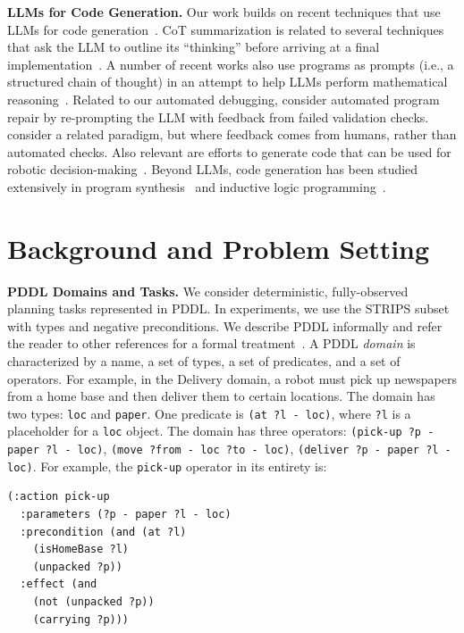 \documentclass[letterpaper]{article} %
\begin{document}
\textbf{LLMs for Code Generation.}
Our work builds on recent techniques that use LLMs for code generation~\cite{chen2021evaluating,nijkamp2023codegen}.
CoT summarization is related to several techniques that ask the LLM to outline its ``thinking'' before arriving at a final implementation~\cite{wei2022chain,jiang2023self,zheng2023outline}.
A number of recent works also use programs as prompts (i.e.,  a structured chain of thought) in an attempt to help LLMs perform mathematical reasoning~\cite{gao2022pal,imani2023mathprompter}.
Related to our automated debugging, \citet{xia2023conversational,chen2023teaching} consider automated program repair by re-prompting the LLM with feedback from failed validation checks.
\citet{chen2023improving} consider a related paradigm, but where feedback comes from humans, rather than automated checks.
Also relevant are efforts to generate code that can be used for robotic decision-making~\cite{liang2022code,singh2022progprompt}.
Beyond LLMs, code generation has been studied extensively in program synthesis~\cite{alur2013syntax,gulwani2017program} and inductive logic programming~\cite{muggleton1991inductive,cropper2022inductive}.

\section{Background and Problem Setting}

\textbf{PDDL Domains and Tasks.}
We consider deterministic, fully-observed planning tasks represented in PDDL.
In experiments, we use the STRIPS subset with types and negative preconditions.
We describe PDDL informally and refer the reader to other references for a formal treatment~\cite{mcdermott-aimag2000}.
A PDDL \emph{domain} is characterized by a name, a set of types, a set of predicates, and a set of operators.
For example, in the Delivery domain, a robot must pick up newspapers from a home base and then deliver them to certain locations.
The domain has two types: \texttt{loc} and \texttt{paper}.
One predicate is \texttt{(at ?l - loc)}, where \texttt{?l} is a placeholder for a \texttt{loc} object.
The domain has three operators: \texttt{(pick-up ?p - paper ?l - loc)}, \texttt{(move ?from - loc ?to - loc)}, \texttt{(deliver ?p - paper ?l - loc)}.
For example, the \texttt{pick-up} operator in its entirety is:
{\footnotesize
\begin{verbatim}
(:action pick-up
  :parameters (?p - paper ?l - loc)
  :precondition (and (at ?l)
    (isHomeBase ?l)
    (unpacked ?p))
  :effect (and
    (not (unpacked ?p))
    (carrying ?p)))
\end{verbatim}
}
\end{document}
